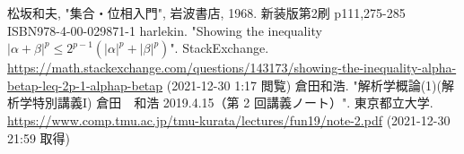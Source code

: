 \documentclass[dvipdfmx]{jsarticle}
\begin{document}
\begin{thebibliography}{50}
  松坂和夫, "集合・位相入門", 岩波書店, 1968. 新装版第2刷 p111,275-285 ISBN978-4-00-029871-1
  harlekin. "Showing the inequality $|\alpha +\beta |^p\le2^{p-1}(|\alpha |^p+|\beta |^p ) $". StackExchange. \url{https://math.stackexchange.com/questions/143173/showing-the-inequality-alpha-betap-leq-2p-1-alphap-betap} (2021-12-30 1:17 閲覧)
  倉田和浩. "解析学概論(1)(解析学特別講義I) 倉田　和浩 2019.4.15（第
  2 回講義ノート）". 東京都立大学. \url{https://www.comp.tmu.ac.jp/tmu-kurata/lectures/fun19/note-2.pdf} (2021-12-30 21:59 取得)
\end{thebibliography}
\end{document}
